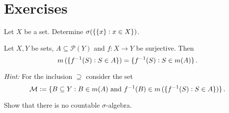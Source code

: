 \section*{Exercises}

\begin{exercise}
	Let $X$ be a set. Determine $\sigma(\cbr[0]{\cbr[0]{x} : x \in X})$.
\end{exercise}

\begin{exercise}
	Let $X,Y$ be sets, $A \subseteq \mathcal{P}(Y)$ and $f: X \to Y$ be surjective. Then 
	\begin{equation}
		m\del[0]{\cbr[0]{f^{-1}(S) : S \in A}} = \cbr[0]{f^{-1}(S) : S \in m(A)}.
	\end{equation}

	\textit{Hint:} For the inclusion $\supseteq$ consider the set 
	\begin{equation}
		\mathcal{M} := \cbr[0]{B \subseteq Y : B \in m(A) \text{ and } f^{-1}(B) \in m\del[0]{\cbr[0]{f^{-1}(S) : S \in A}}}.
	\end{equation}
\end{exercise}

\begin{exercise}
	Show that there is no countable $\sigma$-algebra.
\end{exercise}

\begin{exercise}
	
\end{exercise}
